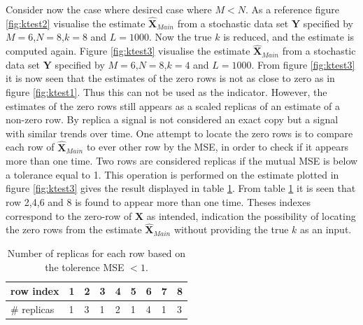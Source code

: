 Consider now the case where desired case where $M<N$. 
As a reference figure \ref{fig:ktest2} visualise the estimate $\hat{\textbf{X}}_{Main}$ from a stochastic data set $\textbf{Y}$ specified by $M=6$,$N=8$,$k=8$ and $L=1000$.  
Now the true $k$ is reduced, and the estimate is computed again.
Figure \ref{fig:ktest3} visualise the estimate $\hat{\textbf{X}}_{Main}$ from a stochastic data set $\textbf{Y}$ specified by $M=6$,$N=8$,$k=4$ and $L=1000$.
From figure \ref{fig:ktest3} it is now seen that the estimates of the zero rows is not as close to zero as in figure \ref{fig:ktest1}. Thus this can not be used as the indicator. However, the estimates of the zero rows still appears as a scaled replicas of an estimate of a non-zero row. By replica a signal is not considered an exact copy but a signal with similar trends over time.
One attempt to locate the zero rows is to compare each row of $\hat{\textbf{X}}_{Main}$ to ever other row by the MSE, in order to check if it appears more than one time.
Two rows are considered replicas if the mutual MSE is below a tolerance equal to 1. This operation is performed on the estimate plotted in figure \ref{fig:ktest3} gives the result displayed in table \ref{tab:replica1}.
From table \ref{tab:replica1} it is seen that row 2,4,6 and 8 is found to appear more than one time. Theses indexes correspond to the zero-row of $\textbf{X}$ as intended, indication the possibility of locating the zero rows from the estimate $\hat{\textbf{X}}_{Main}$ without providing the true $k$ as an input.      

\begin{table}[h]
\center
\begin{tabular}{|l|l|l|l|l|l|l|l|l|}
\hline
row index   & 1 & 2 & 3 & 4 & 5 & 6 & 7 & 8 \\ \hline
\# replicas & 1 & 3 & 1 & 2 & 1 & 4 & 1 & 3 \\ \hline
\end{tabular}
\caption{Number of replicas for each row based on the tolerence MSE $< 1$.}
\label{tab:replica1}
\end{table}


